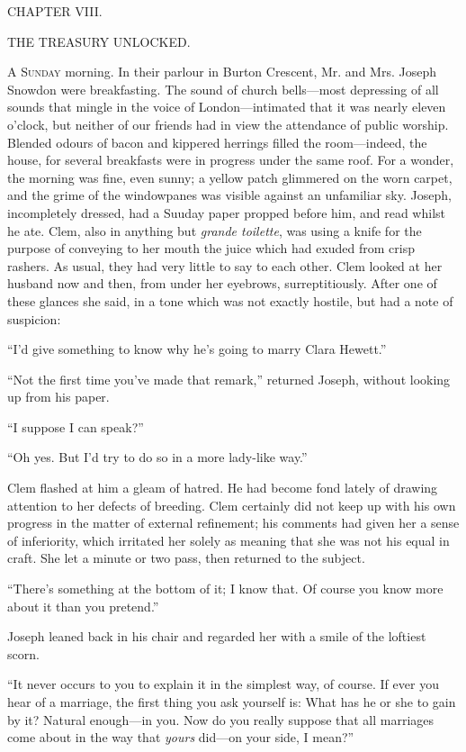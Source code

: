 {}

{CHAPTER VIII.}

THE TREASURY UNLOCKED.

\textsc{A Sunday} morning. In their parlour in Burton Crescent, Mr. and
Mrs. Joseph Snowdon were breakfasting. The sound of church bells---most
depressing of all sounds that mingle in the voice of London---intimated
that it was nearly eleven o'clock, but neither of our friends had in
view the attendance of public worship. Blended odours of bacon and
kippered herrings filled the room---indeed, the house, for several
breakfasts were in progress under the same roof. For a wonder, the
morning was fine, even sunny; a yellow patch glimmered on the worn
carpet, and the grime of the windowpanes was visible against an
unfamiliar sky. Joseph, incompletely dressed, had a Suuday paper propped
before him, and read whilst he ate. Clem, also in anything but
\emph{grande toilette}, was using a knife for the purpose of {}conveying
to her mouth the juice which had exuded from crisp rashers. As usual,
they had very little to say to each other. Clem looked at her husband
now and then, from under her eyebrows, surreptitiously. After one of
these glances she said, in a tone which was not exactly hostile, but had
a note of suspicion:

``I'd give something to know why he's going to marry Clara Hewett.''

``Not the first time you've made that remark,'' returned Joseph, without
looking up from his paper.

``I suppose I can speak?''

``Oh yes. But I'd try to do so in a more lady-like way.''

Clem flashed at him a gleam of hatred. He had become fond lately of
drawing attention to her defects of breeding. Clem certainly did not
keep up with his own progress in the matter of external refinement; his
comments had given her a sense of inferiority, which irritated her
solely as meaning that she was not his equal in craft. She let a minute
or two pass, then returned to the subject.

``There's something at the bottom of it; I {}know that. Of course you
know more about it than you pretend.''

Joseph leaned back in his chair and regarded her with a smile of the
loftiest scorn.

``It never occurs to you to explain it in the simplest way, of course.
If ever you hear of a marriage, the first thing you ask yourself is:
What has he or she to gain by it? Natural enough---in you. Now do you
really suppose that all marriages come about in the way that
\emph{yours} did---on your side, I mean?''

